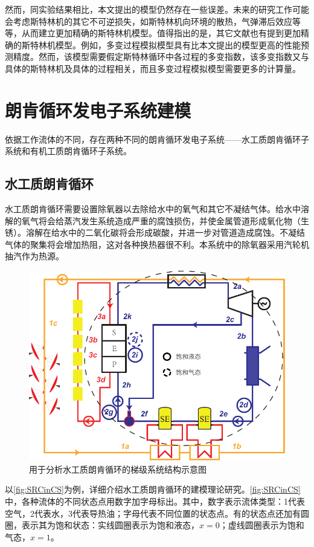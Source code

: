 然而，同实验结果相比，本文提出的模型仍然存在一些误差。未来的研究工作可能会考虑斯特林机的其它不可逆损失，如斯特林机向环境的散热，气弹滞后效应等等，从而建立更加精确的斯特林机模型。值得指出的是，其它文献也有提到更加精确的斯特林机模型。例如，多变过程模拟模型具有比本文提出的模型更高的性能预测精度\cite{Hosseinzade2015, Babaelahi2015}。然而，该模型需要假定斯特林循环中各过程的多变指数，该多变指数又与具体的斯特林机及具体的过程相关，而且多变过程模拟模型需要更多的计算量。

\section{朗肯循环发电子系统建模}
依据工作流体的不同，存在两种不同的朗肯循环发电子系统——水工质朗肯循环子系统和有机工质朗肯循环子系统。

\subsection{水工质朗肯循环}
  
  水工质朗肯循环需要设置除氧器以去除给水中的氧气和其它不凝结气体。给水中溶解的氧气将会给蒸汽发生系统造成严重的腐蚀损伤，并使金属管道形成氧化物（生锈）。溶解在给水中的二氧化碳将会形成碳酸，并进一步对管道造成腐蚀。不凝结气体的聚集将会增加热阻，这对各种换热器很不利。本系统中的除氧器采用汽轮机抽汽作为热源。
  
\begin{figure}[!ht]
\centering
	\includegraphics[width = 0.8\columnwidth]{fig/SRCinCS}
	\caption{用于分析水工质朗肯循环的梯级系统结构示意图}
	\label{fig:SRCinCS}
\end{figure}
  
  以\autoref{fig:SRCinCS}为例，详细介绍水工质朗肯循环的建模理论研究。\autoref{fig:SRCinCS}中，各种流体的不同状态点用数字加字母标出。其中，数字表示流体类型：1代表空气，2代表水，3代表导热油；字母代表不同位置的状态点。有的状态点还加有圆圈，表示其为饱和状态：实线圆圈表示为饱和液态，$x = 0$；虚线圆圈表示为饱和气态，$x = 1$。

